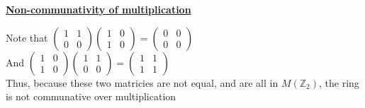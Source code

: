 \documentclass{article} %
\begin{document}
\begin{addmargin}[1em]{0em}
\underline{\textbf{Non-communativity of multiplication}}
\begin{addmargin}[1em]{0em}
Note that $\left(\begin{smallmatrix} 1& 1\\ 0& 0\end{smallmatrix} \right)  \left(\begin{smallmatrix} 1& 0\\ 1& 0\end{smallmatrix} \right) = \left(\begin{smallmatrix} 0& 0\\ 0& 0\end{smallmatrix} \right)$
\\And $\left(\begin{smallmatrix} 1& 0\\ 1& 0\end{smallmatrix} \right)  \left(\begin{smallmatrix} 1& 1\\ 0& 0\end{smallmatrix} \right) = \left(\begin{smallmatrix} 1& 1\\ 1& 1\end{smallmatrix} \right)$
\\Thus, because these two matricies are not equal, and are all in $M(\mathbb{Z}_2)$, the ring is not communative over multiplication
\end{addmargin}


\end{addmargin}
\end{document}
